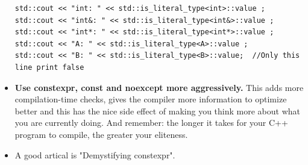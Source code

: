 \documentclass[a4paper,11pt,twoside]{book}
\begin{document}
\begin{itemize}
\begin{lstlisting}[]
std::cout << "int: " << std::is_literal_type<int>::value ;
std::cout << "int&: " << std::is_literal_type<int&>::value ;
std::cout << "int*: " << std::is_literal_type<int*>::value ;
std::cout << "A: " << std::is_literal_type<A>::value ;
std::cout << "B: " << std::is_literal_type<B>::value;  //Only this line print false
\end{lstlisting}
	
	\item \textbf{Use constexpr, const and noexcept more aggressively.} This adds more compilation-time checks, gives the compiler more information to optimize better and this has the nice side effect of making you think more about what you are currently doing. And remember: the longer it takes for your C++ program to compile, the greater your eliteness.

	\item A good artical is "Demystifying constexpr". 
\end{itemize}
\end{document}
